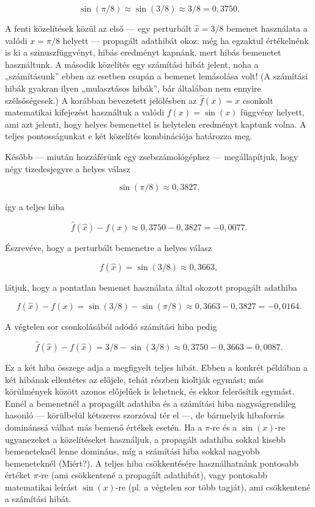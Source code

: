 \documentclass[
  magyar,
  11pt]{article}
\begin{document}
\[\sin(\pi/8) \approx \sin(3/8) \approx 3/8 = 0{,}3750.\]

A fenti közelítések közül az első --- egy perturbált \(\hat{x} = 3/8\)
bemenet használata a valódi \(x = \pi/8\) helyett --- propagált
adathibát okoz: még ha egzaktul értékelnénk is ki a szinuszfüggvényt,
hibás eredményt kapnánk, mert hibás bemenetet használtunk. A második
közelítés egy számítási hibát jelent, noha a „számításunk'' ebben az
esetben csupán a bemenet lemásolása volt! (A számítási hibák gyakran
ilyen „mulasztásos hibák'', bár általában nem ennyire szélsőségesek.) A
korábban bevezetett jelölésben az \(\hat{f}(x) = x\) csonkolt
matematikai kifejezést használtuk a valódi \(f(x) = \sin(x)\) függvény
helyett, ami azt jelenti, hogy helyes bemenettel is helytelen eredményt
kaptunk volna. A teljes pontosságunkat e két közelítés kombinációja
határozza meg.

Később --- miután hozzáférünk egy zsebszámológéphez --- megállapítjuk,
hogy négy tizedesjegyre a helyes válasz

\[\sin(\pi/8) \approx 0{,}3827,\]

így a teljes hiba

\[\hat{f}(\hat{x}) - f(x) \approx 0{,}3750 - 0{,}3827 = -0{,}0077.\]

Észrevéve, hogy a perturbált bemenetre a helyes válasz

\[f(\hat{x}) = \sin(3/8) \approx 0{,}3663,\]

látjuk, hogy a pontatlan bemenet használata által okozott propagált
adathiba

\[f(\hat{x}) - f(x) = \sin(3/8) - \sin(\pi/8) \approx 0{,}3663 - 0{,}3827 = -0{,}0164.\]

A végtelen sor csonkolásából adódó számítási hiba pedig

\[\hat{f}(\hat{x}) - f(\hat{x}) = 3/8 - \sin(3/8) \approx 0{,}3750 - 0{,}3663 = 0{,}0087.\]

Ez a két hiba összege adja a megfigyelt teljes hibát. Ebben a konkrét
példában a két hibának ellentétes az előjele, tehát részben kioltják
egymást; más körülmények között azonos előjelűek is lehetnek, és ekkor
felerősítik egymást. Ennél a bemenetnél a propagált adathiba és a
számítási hiba nagyságrendileg hasonló --- körülbelül kétszeres
szorzóval tér el ---, de bármelyik hibaforrás dominánssá válhat más
bemenő értékek esetén. Ha a \(\pi\)-re és a \(\sin(x)\)-re ugyanezeket a
közelítéseket használjuk, a propagált adathiba sokkal kisebb
bemeneteknél lenne domináns, míg a számítási hiba sokkal nagyobb
bemeneteknél (Miért?). A teljes hiba csökkentésére használhatnánk
pontosabb értéket \(\pi\)-re (ami csökkentené a propagált adathibát),
vagy pontosabb matematikai leírást \(\sin(x)\)-re (pl. a végtelen sor
több tagját), ami csökkentené a számítási hibát.
\end{document}
